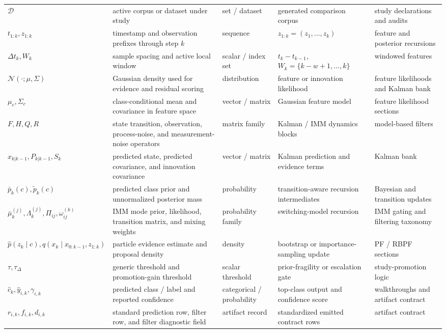 \begin{tabularx}{\textwidth}{>{\raggedright\arraybackslash}p{}X>{\raggedright\arraybackslash}p{}>{\raggedright\arraybackslash}p{}>{\raggedright\arraybackslash}p{}}
\(\mathcal{D}\) & active corpus or dataset under study & set / dataset & generated comparison corpus & study declarations and audits \\
\(t_{1:k}, z_{1:k}\) & timestamp and observation prefixes through step \(k\) & sequence & \(z_{1:k} = (z_1,\dots,z_k)\) & feature and posterior recursions \\
\(\Delta t_k, W_k\) & sample spacing and active local window & scalar / index set & \(t_k - t_{k-1}\), \(W_k = \{k-w+1,\dots,k\}\) & windowed features \\
\(\mathcal{N}(\cdot; \mu, \Sigma)\) & Gaussian density used for evidence and residual scoring & distribution & feature or innovation likelihood & feature likelihoods and Kalman bank \\
\(\mu_c, \Sigma_c\) & class-conditional mean and covariance in feature space & vector / matrix & Gaussian feature model & feature likelihood sections \\
\(F, H, Q, R\) & state transition, observation, process-noise, and measurement-noise operators & matrix family & Kalman / IMM dynamics blocks & model-based filters \\
\(\hat{x}_{k|k-1}, P_{k|k-1}, S_k\) & predicted state, predicted covariance, and innovation covariance & vector / matrix & Kalman prediction and evidence terms & Kalman bank \\
\(\bar{p}_k(c), \tilde{p}_k(c)\) & predicted class prior and unnormalized posterior mass & probability & transition-aware recursion intermediates & Bayesian and transition updates \\
\(\bar{\mu}_k^{(j)}, \Lambda_k^{(j)}, \Pi_{ij}, \omega_{ij}^{(k)}\) & IMM mode prior, likelihood, transition matrix, and mixing weights & probability family & switching-model recursion & IMM gating and filtering taxonomy \\
\(\hat{p}(z_k \mid c), q(x_k \mid x_{0:k-1}, z_{1:k})\) & particle evidence estimate and proposal density & density & bootstrap or importance-sampling update & PF / RBPF sections \\
\(\tau, \tau_{\Delta}\) & generic threshold and promotion-gain threshold & scalar threshold & prior-fragility or escalation gate & study-promotion logic \\
\(\hat{c}_k, \hat{y}_{i,k}, \gamma_{i,k}\) & predicted class / label and reported confidence & categorical / probability & top-class output and confidence score & walkthroughs and artifact contract \\
\(r_{i,k}, f_{i,k}, d_{i,k}\) & standard prediction row, filter row, and filter diagnostic field & artifact record & standardized emitted contract rows & artifact contract \\

\end{tabularx}
